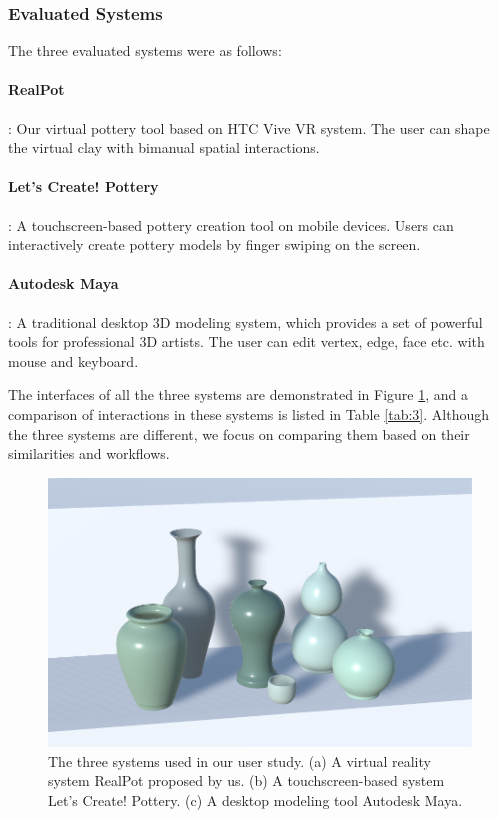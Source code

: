 \subsubsection{Evaluated Systems}

The three evaluated systems were as follows:

\paragraph{RealPot}: Our virtual pottery tool based on HTC Vive VR system. The user can shape the virtual clay with bimanual spatial interactions.
\paragraph{Let’s Create! Pottery}: A touchscreen-based pottery creation tool on mobile devices. Users can interactively create pottery models by finger swiping on the screen.
\paragraph{Autodesk Maya}: A traditional desktop 3D modeling system, which provides a set of powerful tools for professional 3D artists. The user can edit vertex, edge, face etc. with mouse and keyboard.

The interfaces of all the three systems are demonstrated in Figure \ref{fig:sys}, and a comparison of interactions in these systems is listed in Table \ref{tab:3}. 
Although the three systems are different, we focus on comparing them based on their similarities and workflows.

\begin{figure}
\includegraphics[width=\textwidth]{fig11}
\caption{The three systems used in our user study. (a) A virtual reality system RealPot proposed by us. (b) A touchscreen-based system Let's Create! Pottery. (c) A desktop modeling tool Autodesk Maya.}
\label{fig:sys}
\end{figure}

